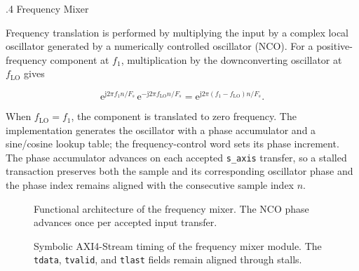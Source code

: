 %
%
\bigskip
{}
.4  \quad Frequency Mixer

Frequency translation is performed by multiplying the input by a complex local oscillator generated by a numerically controlled oscillator (NCO).  For a positive-frequency component at $f_1$, multiplication by the downconverting oscillator at $f_{\mathrm{LO}}$ gives

\begin{equation*}
\mathrm{e}^{\mathrm{j}2\pi f_1n/F_s}\,\mathrm{e}^{-\mathrm{j}2\pi f_{\mathrm{LO}}n/F_s}
=\mathrm{e}^{\mathrm{j}2\pi(f_1-f_{\mathrm{LO}})n/F_s}.
\end{equation*}

When $f_{\mathrm{LO}}=f_1$, the component is translated to zero frequency.  The implementation generates the oscillator with a phase accumulator and a sine/cosine lookup table; the frequency-control word sets its phase increment.  The phase accumulator advances on each accepted \texttt{s\_axis} transfer, so a stalled transaction preserves both the sample and its corresponding oscillator phase and the phase index remains aligned with the consecutive sample index $n$.

\begin{figure}[H]
\begin{center}
\resizebox{\textwidth}{!}{}
\caption{Functional architecture of the frequency mixer. The NCO phase advances once per accepted input transfer.}
\label{fig:mixer}
\end{center}
\end{figure}

\begin{figure}[H]
\begin{center}
\resizebox{0.96\textwidth}{!}{}
\caption{Symbolic AXI4-Stream timing of the frequency mixer module. The \texttt{tdata}, \texttt{tvalid}, and \texttt{tlast} fields remain aligned through stalls.}
\label{fig:5_GenMixer}
\end{center}
\end{figure}


